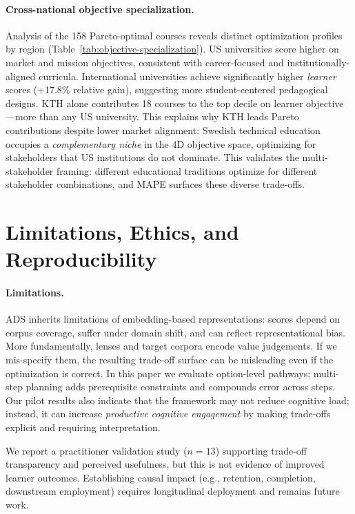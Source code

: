 \documentclass{article}
\newcommand{\ADS}{\textsc{ADS}\xspace}
\newcommand{\MAPE}{\textsc{MAPE}\xspace}
\begin{document}


\paragraph{Cross-national objective specialization.}
Analysis of the 158 Pareto-optimal courses reveals distinct optimization profiles by region (Table~\ref{tab:objective-specialization}). US universities score higher on market and mission objectives, consistent with career-focused and institutionally-aligned curricula. International universities achieve significantly higher \emph{learner} scores (+17.8\% relative gain), suggesting more student-centered pedagogical designs. KTH alone contributes 18 courses to the top decile on learner objective---more than any US university. This explains why KTH leads Pareto contributions despite lower market alignment: Swedish technical education occupies a \emph{complementary niche} in the 4D objective space, optimizing for stakeholders that US institutions do not dominate. This validates the multi-stakeholder framing: different educational traditions optimize for different stakeholder combinations, and \MAPE surfaces these diverse trade-offs.





\section{Limitations, Ethics, and Reproducibility}
\label{sec:ethics}
\paragraph{Limitations.}
\ADS inherits limitations of embedding-based representations: scores depend on corpus coverage, suffer under domain shift, and can reflect representational bias. More fundamentally, lenses and target corpora encode value judgements. If we mis-specify them, the resulting trade-off surface can be misleading even if the optimization is correct. In this paper we evaluate option-level pathways; multi-step planning adds prerequisite constraints and compounds error across steps. Our pilot results also indicate that the framework may not reduce cognitive load; instead, it can increase \emph{productive cognitive engagement} by making trade-offs explicit and requiring interpretation.

We report a practitioner validation study ($n{=}13$) supporting trade-off transparency and perceived usefulness, but this is not evidence of improved learner outcomes. Establishing causal impact (e.g., retention, completion, downstream employment) requires longitudinal deployment and remains future work.
\end{document}
